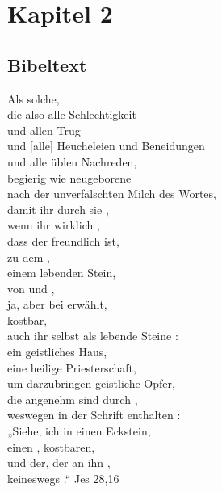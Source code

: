\section{Kapitel 2}
\subsection{Bibeltext}

    Als solche, \\
    die also  alle Schlechtigkeit \\
        und allen Trug \\
        und [alle] Heucheleien und Beneidungen \\
        und alle üblen Nachreden, \\
     begierig wie neugeborene  \\
        nach der unverfälschten Milch des Wortes, \\
    damit ihr durch sie , \\
    wenn ihr wirklich , \\
        dass der  freundlich ist, \\
        zu dem , \\
            einem lebenden Stein, \\
            von   und , \\
            ja, aber bei  erwählt, \\
            kostbar, \\
        auch ihr selbst als lebende Steine : \\
            ein geistliches Haus, \\
            eine heilige Priesterschaft, \\
            um darzubringen geistliche Opfer, \\
            die  angenehm sind durch , \\
        weswegen in der Schrift enthalten : \\
            „Siehe, ich  in  einen Eckstein, \\
            einen , kostbaren, \\
            und der, der an ihn , \\
             keineswegs .“ {Jes 28,16} \\


